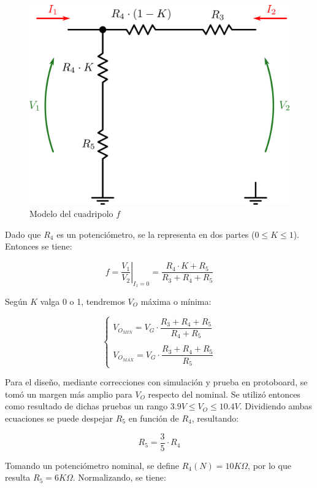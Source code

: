 \begin{figure}[!h]
\begin{centering}
\includegraphics[scale=0.34]{Imagenes/CuadripoloF.png}
\par\end{centering}
\caption{Modelo del cuadripolo $f$}

\end{figure}

Dado que $R_4$ es un potenci\'ometro, se la representa en dos partes ($0 \leq K \leq 1$). Entonces se tiene:

$$f = \left. \frac{V_1}{V_2} \right|_{I_1=0} = \frac{R_4 \cdot K + R_5}{R_3 + R_4 + R_5}$$

Seg\'un $K$ valga 0 o 1, tendremos $V_O$ m\'axima o m\'inima:

\[
\left\lbrace
\begin{array}{l}
V_{O_{MIN}} = V_G \cdot \dfrac{R_3+R_4+R_5}{R_4+R_5}\\ \\
V_{O_{MAX}} = V_G \cdot \dfrac{R_3+R_4+R_5}{R_5}
\end{array}
\right.
\]

Para el dise\~no, mediante correcciones con simulaci\'on y prueba en protoboard, se tom\'o un margen m\'as amplio para $V_O$ respecto del nominal. Se utiliz\'o entonces como resultado de dichas pruebas un rango $3.9V \leq V_O \leq 10.4V$. Dividiendo ambas ecuaciones se puede despejar $R_5$ en funci\'on de $R_4$, resultando:

$$R_5 = \frac{3}{5} \cdot R_4$$

Tomando un potenci\'ometro nominal, se define $R_4(N) = 10K\Omega$, por lo que resulta $R_5 = 6K\Omega$. Normalizando, se tiene:

